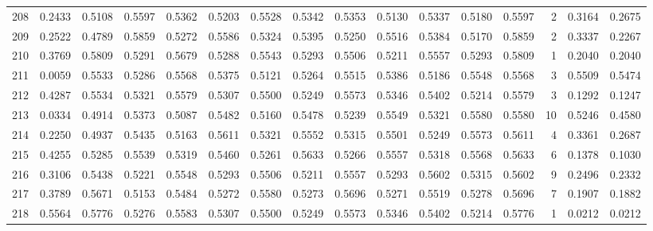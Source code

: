 \begin{tabular}{lrrrrrrrrrrrrrrr}
208 &      0.2433 &  0.5108 &  0.5597 &  0.5362 &  0.5203 &  0.5528 &  0.5342 &  0.5353 &  0.5130 &  0.5337 &   0.5180 &     0.5597 &      2 &                    0.3164 &                     0.2675 \\
209 &      0.2522 &  0.4789 &  0.5859 &  0.5272 &  0.5586 &  0.5324 &  0.5395 &  0.5250 &  0.5516 &  0.5384 &   0.5170 &     0.5859 &      2 &                    0.3337 &                     0.2267 \\
210 &      0.3769 &  0.5809 &  0.5291 &  0.5679 &  0.5288 &  0.5543 &  0.5293 &  0.5506 &  0.5211 &  0.5557 &   0.5293 &     0.5809 &      1 &                    0.2040 &                     0.2040 \\
211 &      0.0059 &  0.5533 &  0.5286 &  0.5568 &  0.5375 &  0.5121 &  0.5264 &  0.5515 &  0.5386 &  0.5186 &   0.5548 &     0.5568 &      3 &                    0.5509 &                     0.5474 \\
212 &      0.4287 &  0.5534 &  0.5321 &  0.5579 &  0.5307 &  0.5500 &  0.5249 &  0.5573 &  0.5346 &  0.5402 &   0.5214 &     0.5579 &      3 &                    0.1292 &                     0.1247 \\
213 &      0.0334 &  0.4914 &  0.5373 &  0.5087 &  0.5482 &  0.5160 &  0.5478 &  0.5239 &  0.5549 &  0.5321 &   0.5580 &     0.5580 &     10 &                    0.5246 &                     0.4580 \\
214 &      0.2250 &  0.4937 &  0.5435 &  0.5163 &  0.5611 &  0.5321 &  0.5552 &  0.5315 &  0.5501 &  0.5249 &   0.5573 &     0.5611 &      4 &                    0.3361 &                     0.2687 \\
215 &      0.4255 &  0.5285 &  0.5539 &  0.5319 &  0.5460 &  0.5261 &  0.5633 &  0.5266 &  0.5557 &  0.5318 &   0.5568 &     0.5633 &      6 &                    0.1378 &                     0.1030 \\
216 &      0.3106 &  0.5438 &  0.5221 &  0.5548 &  0.5293 &  0.5506 &  0.5211 &  0.5557 &  0.5293 &  0.5602 &   0.5315 &     0.5602 &      9 &                    0.2496 &                     0.2332 \\
217 &      0.3789 &  0.5671 &  0.5153 &  0.5484 &  0.5272 &  0.5580 &  0.5273 &  0.5696 &  0.5271 &  0.5519 &   0.5278 &     0.5696 &      7 &                    0.1907 &                     0.1882 \\
218 &      0.5564 &  0.5776 &  0.5276 &  0.5583 &  0.5307 &  0.5500 &  0.5249 &  0.5573 &  0.5346 &  0.5402 &   0.5214 &     0.5776 &      1 &                    0.0212 &                     0.0212 \\

\end{tabular}
